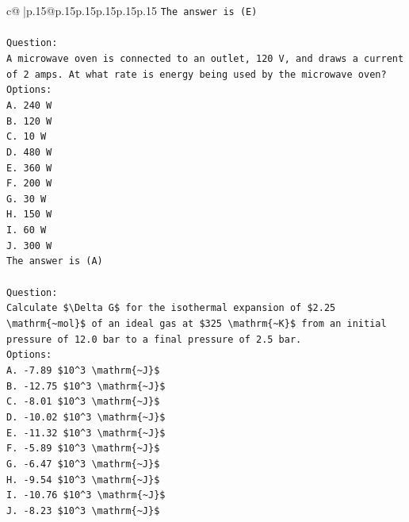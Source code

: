 \documentclass{article}
\begin{document}
{\begin{supertabular}{c@{$\;$}|p{.15\linewidth}@{}p{.15\linewidth}p{.15\linewidth}p{.15\linewidth}p{.15\linewidth}p{.15\linewidth}}
{{{\texttt{The answer is (E)} \\
\\ 
\texttt{Question:} \\
\texttt{A microwave oven is connected to an outlet, 120 V, and draws a current of 2 amps. At what rate is energy being used by the microwave oven?} \\
\texttt{Options:} \\
\texttt{A. 240 W} \\
\texttt{B. 120 W} \\
\texttt{C. 10 W} \\
\texttt{D. 480 W} \\
\texttt{E. 360 W} \\
\texttt{F. 200 W} \\
\texttt{G. 30 W} \\
\texttt{H. 150 W} \\
\texttt{I. 60 W} \\
\texttt{J. 300 W} \\
\texttt{The answer is (A)} \\
\\ 
\texttt{Question:} \\
\texttt{Calculate \$\textbackslash{}Delta G\$ for the isothermal expansion of \$2.25 \textbackslash{}mathrm\{\textasciitilde{}mol\}\$ of an ideal gas at \$325 \textbackslash{}mathrm\{\textasciitilde{}K\}\$ from an initial pressure of 12.0 bar to a final pressure of 2.5 bar.} \\
\texttt{Options:} \\
\texttt{A. {-}7.89 \$10\^{}3 \textbackslash{}mathrm\{\textasciitilde{}J\}\$} \\
\texttt{B. {-}12.75 \$10\^{}3 \textbackslash{}mathrm\{\textasciitilde{}J\}\$} \\
\texttt{C. {-}8.01 \$10\^{}3 \textbackslash{}mathrm\{\textasciitilde{}J\}\$} \\
\texttt{D. {-}10.02 \$10\^{}3 \textbackslash{}mathrm\{\textasciitilde{}J\}\$} \\
\texttt{E. {-}11.32 \$10\^{}3 \textbackslash{}mathrm\{\textasciitilde{}J\}\$} \\
\texttt{F. {-}5.89 \$10\^{}3 \textbackslash{}mathrm\{\textasciitilde{}J\}\$} \\
\texttt{G. {-}6.47 \$10\^{}3 \textbackslash{}mathrm\{\textasciitilde{}J\}\$} \\
\texttt{H.  {-}9.54 \$10\^{}3 \textbackslash{}mathrm\{\textasciitilde{}J\}\$} \\
\texttt{I. {-}10.76 \$10\^{}3 \textbackslash{}mathrm\{\textasciitilde{}J\}\$} \\
\texttt{J. {-}8.23 \$10\^{}3 \textbackslash{}mathrm\{\textasciitilde{}J\}\$} \\
            }
        }
    }
     \\ \\


\end{supertabular}}
\end{document}
